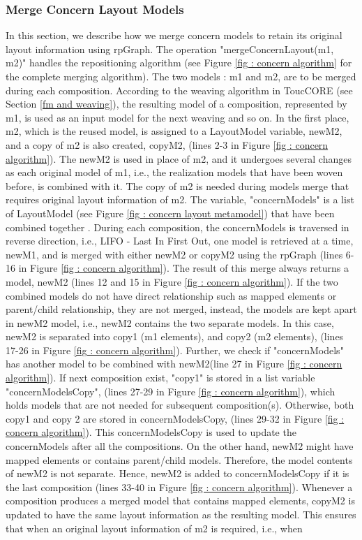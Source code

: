 \subsubsection{Merge Concern Layout Models}
In this section, we describe how we merge concern models to retain its original layout information using rpGraph. The operation "mergeConcernLayout(m1, m2)" handles the repositioning algorithm (see Figure \ref{fig : concern algorithm} for the complete merging algorithm). The two models : m1 and m2, are to be merged during each composition.  According to the weaving algorithm in ToucCORE (see Section \ref{fm and weaving}), the resulting model of a composition, represented by m1, is used as an input model for the next weaving and so on. In the first place, m2, which is the reused model, is assigned to a LayoutModel variable, newM2, and a copy of m2 is also created, copyM2, (lines 2-3 in Figure \ref{fig : concern algorithm}). The newM2 is used in place of m2, and it undergoes several changes as each original model of m1, i.e., the realization models that have been woven before, is combined with it. The copy of m2 is needed during models merge that requires original layout information of m2. The variable, "concernModels" is a list of LayoutModel (see Figure \ref{fig : concern layout metamodel}) that have been combined together . During each composition, the concernModels is traversed in reverse direction, i.e., LIFO - Last In First Out, one model is retrieved at a time, newM1, and is merged with either newM2 or copyM2 using the rpGraph (lines 6-16 in Figure  \ref{fig : concern algorithm}). The result of this merge always returns a model, newM2 (lines 12 and 15 in Figure \ref{fig : concern algorithm}). If the two combined models do not have direct relationship such as mapped elements or parent/child relationship, they are not merged, instead, the models are kept apart in newM2 model, i.e., newM2 contains the two separate models. In this case, newM2 is separated into copy1 (m1 elements), and copy2 (m2 elements), (lines 17-26 in Figure  \ref{fig : concern algorithm}). Further, we check if "concernModels" has another model to be combined with newM2(line 27 in Figure  \ref{fig : concern algorithm}). If next composition exist, "copy1" is stored in a list variable "concernModelsCopy", (lines 27-29 in Figure  \ref{fig : concern algorithm}), which holds models that are not needed for subsequent composition(s). Otherwise,  both copy1 and copy 2 are stored in concernModelsCopy, (lines 29-32 in Figure  \ref{fig : concern algorithm}).  This concernModelsCopy is used to update the concernModels after all the compositions. On the other hand, newM2 might have mapped elements or contains parent/child models. Therefore, the model contents of newM2 is not separate. Hence, newM2 is added to concernModelsCopy if it is the last composition (lines 33-40 in Figure  \ref{fig : concern algorithm}). Whenever a composition produces a merged model that contains mapped elements, copyM2 is updated to have the same layout information as the resulting model.  This ensures that when an original layout information of m2 is required, i.e., when 